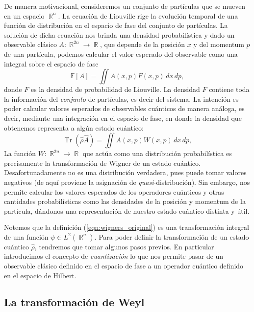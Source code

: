 \documentclass[a4paper]{report}
\DeclareMathOperator{\R}{\mathbb{R}}
\DeclareMathOperator{\Tr}{Tr}
\begin{document}
  De manera motivacional, consideremos un conjunto de
  partículas que se mueven en un espacio $\R^{n}$. La
  ecuación de Liouville rige la evolución temporal de una
  función de distribución en el espacio de fase del conjunto
  de partículas. La solución de dicha ecuación nos brinda
  una densidad probabilística y dado un observable clásico
  $A : \R^{2n} \to \R$, que depende de la posición $x$ y del
  momentum $p$ de una partícula, podemos calcular el valor
  esperado del observable como una integral sobre el espacio
  de fase
  \begin{equation}
    \mathbb E[A]
    = \iint A(x,p) F(x,p) \, dx \, dp,
  \end{equation}
  donde $F$ es la densidad de probabilidad de Liouville. La
  densidad $F$ contiene toda la información del
  \textit{conjunto} de partículas, es decir del sistema. La
  intención es poder calcular valores esperados de
  observables cuánticos de manera análoga, es decir,
  mediante una integración en el espacio de fase, en donde
  la densidad que obtenemos representa a algún estado
  cuántico:
  \begin{equation}
    \Tr\left(\hat{\rho} \hat{A}\right)
    = \iint A(x,p)W(x,p) \, dx \, dp,
  \end{equation}
  La función $W : \R^{2n} \to \R$ que actúa como una
  distribución probabilística es precisamente la
  transformación de Wigner de un estado cuántico.
  Desafortunadamente no es una distribución verdadera, pues
  puede tomar valores negativos (de aquí proviene la
  asignación de \textit{quasi}-distribución). Sin embargo,
  nos permite calcular los valores esperados de los
  operadores cuánticos y otras cantidades probabilísticas
  como las densidades de la posición y momentum de la
  partícula, dándonos una representación de nuestro estado
  cuántico distinta y útil.

  Notemos que la definición (\ref{eqn:wigners_original}) es
  una transformación integral de una función $\psi \in
  L^2(\R^{n})$. Para poder definir la transformación de un
  estado cuántico $\hat{\rho}$, tendremos que tomar algunos
  pasos previos. En particular introducimos el concepto de
  \textit{cuantización} lo que nos permite pasar de un
  observable clásico definido en el espacio de fase a un
  operador cuántico definido en el espacio de Hilbert.

  \subsection{La transformación de Weyl}
\end{document}
